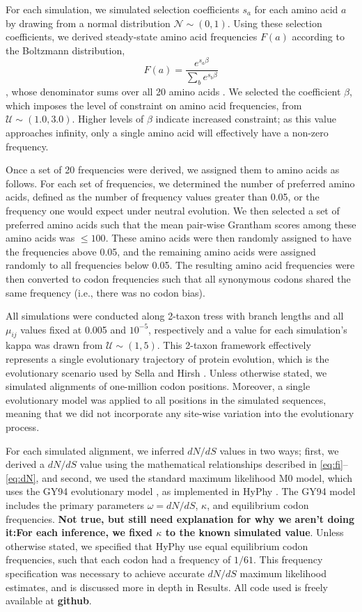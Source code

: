 \documentclass[11pt]{article}
\begin{document}
For each simulation, we simulated selection coefficients $s_a$ for each amino acid $a$ by drawing from a normal distribution $\mathcal{N} \sim (0, 1)$. Using these selection coefficients, we derived steady-state amino acid frequencies $F(a)$ according to the Boltzmann distribution, \begin{equation} F(a) = \frac{e^{s_a\beta}}{\sum_b e^{s_b\beta}} \end{equation}, whose denominator sums over all 20 amino acids \cite{SellaHirsh2005, Ramseyetal2011}. We selected the coefficient $\beta$, which imposes the level of constraint on amino acid frequencies, from $\mathcal{U} \sim (1.0, 3.0)$. Higher levels of $\beta$ indicate increased constraint; as this value approaches infinity, only a single amino acid will effectively have a non-zero frequency.

Once a set of 20 frequencies were derived, we assigned them to amino acids as follows. For each set of frequencies, we determined the number of preferred amino acids, defined as the number of frequency values greater than 0.05, or the frequency one would expect under neutral evolution.  We then selected a set of preferred amino acids such that the mean pair-wise Grantham scores among these amino acids was $\leq 100$. These amino acids were then randomly assigned to have the frequencies above 0.05, and the remaining amino acids were assigned randomly to all frequencies below 0.05. The resulting amino acid frequencies were then converted to codon frequencies such that all synonymous codons shared the same frequency (i.e., there was no codon bias).

All simulations were conducted along 2-taxon tress with branch lengths and all $\mu_{ij}$ values fixed at 0.005 and $10^{-5}$, respectively and a value for each simulation's kappa was drawn from $\mathcal{U} \sim (1, 5)$. This 2-taxon framework effectively represents a single evolutionary trajectory of protein evolution, which is the evolutionary scenario used by Sella and Hirsh \cite{SellaHirsh2005}. Unless otherwise stated, we simulated alignments of one-million codon positions. Moreover, a single evolutionary model was applied to all positions in the simulated sequences, meaning that we did not incorporate any site-wise variation into the evolutionary process. 

For each simulated alignment, we inferred $dN/dS$ values in two ways; first, we derived a $dN/dS$ value using the mathematical relationships described in \eqref{eq:fi}--\eqref{eq:dN}, and second, we used the standard maximum likelihood M0 model, which uses the GY94 evolutionary model \cite{GoldmanYang1994}, as implemented in HyPhy \cite{KosakovskyPondetal2005}. The GY94 model includes the primary parameters $\omega=dN/dS$, $\kappa$, and equilibrium codon frequencies. \textbf{Not true, but still need explanation for why we aren't doing it:For each inference, we fixed $\kappa$ to the known simulated value}. Unless otherwise stated, we specified that HyPhy use equal equilibrium codon frequencies, such that each codon had a frequency of $1/61$. This frequency specification was necessary to achieve accurate $dN/dS$ maximum likelihood estimates, and is discussed more in depth in Results. All code used is freely available at \textbf{github}.
\end{document}
